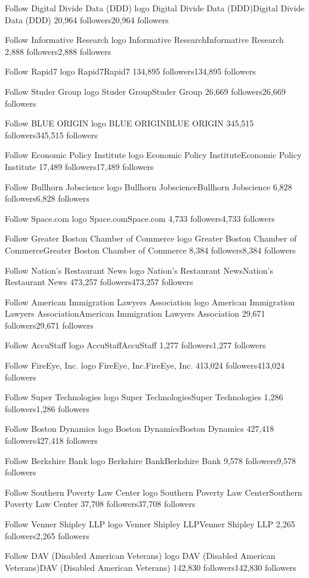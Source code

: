Follow
Digital Divide Data (DDD) logo
Digital Divide Data (DDD)Digital Divide Data (DDD)
20,964 followers20,964 followers

Follow
Informative Research logo
Informative ResearchInformative Research
2,888 followers2,888 followers

Follow
Rapid7 logo
Rapid7Rapid7
134,895 followers134,895 followers

Follow
Studer Group logo
Studer GroupStuder Group
26,669 followers26,669 followers

Follow
BLUE ORIGIN logo
BLUE ORIGINBLUE ORIGIN
345,515 followers345,515 followers

Follow
Economic Policy Institute logo
Economic Policy InstituteEconomic Policy Institute
17,489 followers17,489 followers

Follow
Bullhorn Jobscience logo
Bullhorn JobscienceBullhorn Jobscience
6,828 followers6,828 followers

Follow
Space.com logo
Space.comSpace.com
4,733 followers4,733 followers

Follow
Greater Boston Chamber of Commerce logo
Greater Boston Chamber of CommerceGreater Boston Chamber of Commerce
8,384 followers8,384 followers

Follow
Nation's Restaurant News logo
Nation's Restaurant NewsNation's Restaurant News
473,257 followers473,257 followers

Follow
American Immigration Lawyers Association logo
American Immigration Lawyers AssociationAmerican Immigration Lawyers Association
29,671 followers29,671 followers

Follow
AccuStaff logo
AccuStaffAccuStaff
1,277 followers1,277 followers

Follow
FireEye, Inc. logo
FireEye, Inc.FireEye, Inc.
413,024 followers413,024 followers

Follow
Super Technologies logo
Super TechnologiesSuper Technologies
1,286 followers1,286 followers

Follow
Boston Dynamics logo
Boston DynamicsBoston Dynamics
427,418 followers427,418 followers

Follow
Berkshire Bank logo
Berkshire BankBerkshire Bank
9,578 followers9,578 followers

Follow
Southern Poverty Law Center logo
Southern Poverty Law CenterSouthern Poverty Law Center
37,708 followers37,708 followers

Follow
Venner Shipley LLP logo
Venner Shipley LLPVenner Shipley LLP
2,265 followers2,265 followers

Follow
DAV (Disabled American Veterans) logo
DAV (Disabled American Veterans)DAV (Disabled American Veterans)
142,830 followers142,830 followers

